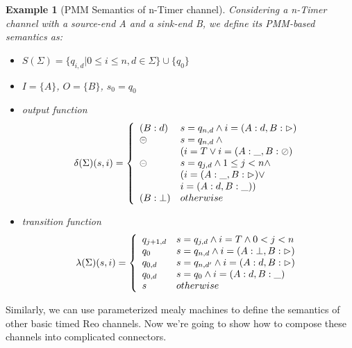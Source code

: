 \documentclass[conference, a4paper]{IEEEtran}
\newtheorem{example}{Example}
\newcommand{\rblock}[0]{\circleddash}
\newcommand{\rread}[0]{\rhd}
\newcommand{\rnoread}[0]{\oslash}
\begin{document}
\begin{example}[PMM Semantics of n-Timer channel]
  Considering a n-Timer channel with a source-end A and a sink-end B, we define its PMM-based
  semantics as:
  \begin{itemize}
    \item[-] $S(\Sigma)=\{q_{i,d}|0\leq i\leq n, d\in \Sigma\}\cup\{q_0\}$
    \item[-] $I=\{A\}$, $O=\{B\}$, $s_0=q_0$
    \item[-] output function
      \begin{displaymath}
        \delta(\Sigma)(s,i)=\left\{
        \begin{array}[ht]{ll}
          (B:d) & s=q_{n,d}\land i=(A:d,B:\rread)\\
          \rblock & s=q_{n,d}\:\land \\
          & (i=T\lor i=(A:\_,B:\rnoread) \\
          \rblock & s=q_{j,d}\land 1 \leq j < n\land \\
          & (i=(A:\_,B:\rread)\lor \\
          & i=(A:d,B:\_))\\
          (B:\bot) & otherwise\\
        \end{array}
        \right.
      \end{displaymath}
    \item[-] transition function
      \begin{displaymath}
        \lambda(\Sigma)(s,i)=\left\{
        \begin{array}[ht]{ll}
          q_{j+1,d} & s=q_{j,d}\land i=T\land0 < j < n\\
          q_0 & s=q_{n,d}\land i=(A:\bot,B:\rread) \\
          q_{0,d} & s=q_{n,d'}\land i=(A:d,B:\rread) \\
          q_{0,d} & s=q_0 \land i=(A:d,B:\_) \\
          s & otherwise \\
        \end{array}
        \right.
      \end{displaymath}
  \end{itemize}
\end{example}

Similarly, we can use parameterized mealy machines to define the semantics of other basic timed Reo
channels. Now we're going to show how to compose these channels into complicated connectors.
\end{document}
